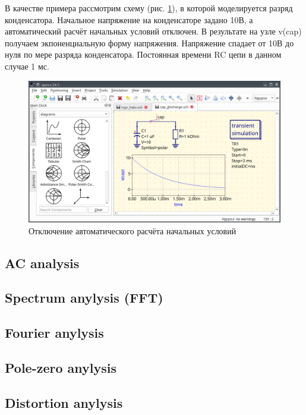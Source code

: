 \documentclass[a4paper,12pt]{article}
\begin{document}
В качестве примера рассмотрим схему (рис. \ref{fig:cap_discharge}), в которой моделируется разряд конденсатора. Начальное напряжение на конденсаторе задано 10В, а автоматический расчёт начальных условий отключен. В результате на узле v(cap) получаем экпоненциальную форму напряжения. Напряжение спадает от 10В до нуля по мере разряда конденсатора. Постоянная времени RC цепи в данном случае 1 мс.

    \begin{figure}[!ht]
    \begin{center}
        \includegraphics[width=\textwidth]{img/cap_discharge.png}
    \end{center}
    \caption{Отключение автоматического расчёта начальных условий} \label{fig:cap_discharge}
    \end{figure}

\subsection{AC analysis}

\subsection{Spectrum anylysis (FFT)}

\subsection{Fourier anylysis}

\subsection{Pole-zero anylysis}

\subsection{Distortion anylysis}
\end{document}
